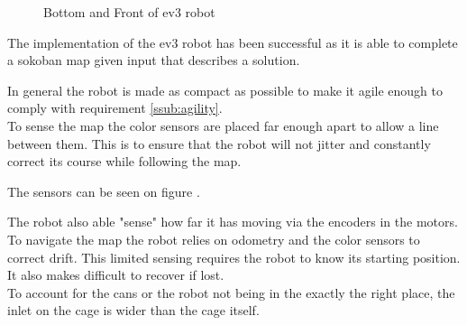 \documentclass[../../main.tex]{subfiles}
\begin{document}
\begin{figure}[h]
	\centering

	\caption{Bottom and Front of ev3 robot}
	\label{fig:front_and_bottom}
\end{figure}

The implementation of the ev3 robot has been successful as it is able to complete a sokoban map given input that describes a solution.

In general the robot is made as compact as possible to make it agile enough to comply with
requirement \ref{ssub:agility}.\\


To sense the map the color sensors are placed far enough apart to allow a line between them.
This is to ensure that the robot will not jitter and constantly correct its course while
following the map.

The sensors can be seen on figure .

The robot also able "sense" how far it has moving via the encoders in the motors.\\

To navigate the map the robot relies on odometry and the color sensors to correct drift.
This limited sensing requires the robot to know its starting position. It also makes difficult
to recover if lost.\\

To account for the cans or the robot not being in the exactly the right place, the inlet on the cage
is wider than the cage itself.
	
\end{document}
